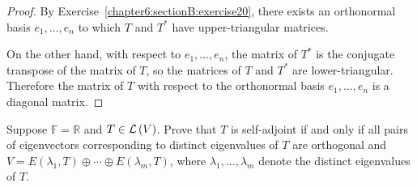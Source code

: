 \begin{proof}
    By Exercise~\ref{chapter6:sectionB:exercise20}, there exists an orthonormal basis $e_{1}, \ldots, e_{n}$ to which $T$ and $T^{*}$ have upper-triangular matrices.

    On the other hand, with respect to $e_{1}, \ldots, e_{n}$, the matrix of $T^{*}$ is the conjugate transpose of the matrix of $T$, so the matrices of $T$ and $T^{*}$ are lower-triangular. Therefore the matrix of $T$ with respect to the orthonormal basis $e_{1}, \ldots, e_{n}$ is a diagonal matrix.
\end{proof}
\newpage

\begin{exercise}\label{chapter7:sectionB:exercise14}
    Suppose $\mathbb{F} = \mathbb{R}$ and $T \in \mathcal{L}\left({V}\right)$. Prove that $T$ is self-adjoint if and only if all pairs of eigenvectors corresponding to distinct eigenvalues of $T$ are orthogonal and $V = E(\lambda_{1}, T)\oplus \cdots\oplus E(\lambda_{m}, T)$, where $\lambda_{1}, \ldots, \lambda_{m}$ denote the distinct eigenvalues of $T$.
\end{exercise}

